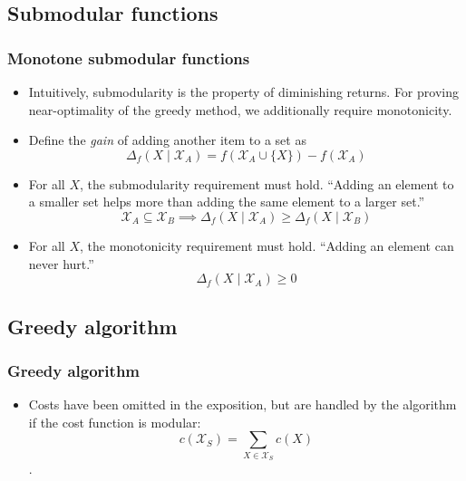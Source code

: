 \documentclass[handout]{beamer}
\begin{document}
\subsection{Submodular functions}

\begin{frame}\frametitle{Monotone submodular functions}
\begin{itemize}
    \item Intuitively, submodularity is the property of diminishing returns. For proving near-optimality of the greedy method, we additionally require monotonicity.
    \pause
    \item Define the \emph{gain} of adding another item to a set as $$\Delta_f(X \mid \mathcal{X}_A) = f(\mathcal{X}_A \cup \{X\}) - f(\mathcal{X}_A)$$
    \pause
    \item For all $X$, the submodularity requirement must hold. ``Adding an element to a smaller set helps more than adding the same element to a larger set.''
$$\mathcal{X}_A \subseteq \mathcal{X}_B \implies \Delta_f(X \mid \mathcal{X}_A) \geq \Delta_f(X \mid \mathcal{X}_B)$$
    \pause
    \item For all $X$, the monotonicity requirement must hold. ``Adding an element can never hurt.''
$$\Delta_f(X \mid \mathcal{X}_A) \geq 0$$
\end{itemize}
\end{frame}

\subsection{Greedy algorithm}

\begin{frame}\frametitle{Greedy algorithm}
\vspace{1em}
\begin{algorithm}[H]
\end{algorithm}
\pause
\begin{itemize}
\item Costs have been omitted in the exposition, but are handled by the algorithm if the cost function is modular: $$c(\mathcal{X}_S) = \sum_{X \in \mathcal{X}_S} c(X)$$.
\end{itemize}
\end{frame}
\end{document}
